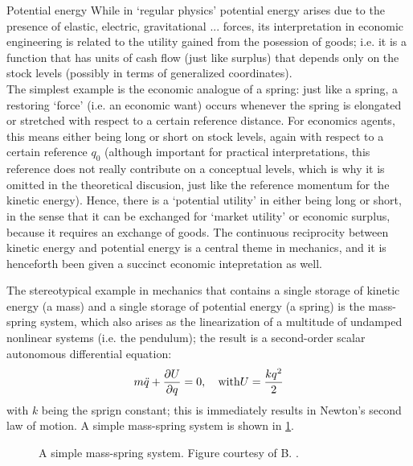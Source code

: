 \begin{econ}{Potential energy}
    While in `regular physics' potential energy arises due to the presence of elastic, electric, gravitational ... forces, its interpretation in economic engineering is related to the utility gained from the posession of goods; i.e. it is a function that has units of cash flow (just like surplus) that depends only on the stock levels (possibly in terms of generalized coordinates).\\

    The simplest example is the economic analogue of a spring: just like a spring, a restoring `force' (i.e. an economic want) occurs whenever the spring is elongated or stretched with respect to a certain reference distance. For economics agents, this means either being long or short on stock levels, again with respect to a certain reference $q_0$ (although important for practical interpretations, this reference does not really contribute on a conceptual levels, which is why it is omitted in the theoretical discusion, just like the reference momentum for the kinetic energy). Hence, there is a `potential utility' in either being long or short, in the sense that it can be exchanged for `market utility' or economic surplus, because it requires an exchange of goods. The continuous reciprocity between kinetic energy and 
    potential energy is a central theme in mechanics, and it is henceforth been given a succinct economic intepretation as well.
\end{econ}
The stereotypical example in mechanics that contains a single storage of kinetic energy (a mass) and a single storage of potential energy (a spring) is the mass-spring system, which also arises as the linearization of a multitude of undamped nonlinear systems (i.e. the pendulum); the result is a second-order scalar autonomous differential equation:
\begin{equation}
    m\ddot{q} + \pdv{U}{q} = 0, \quad \text{with} U = \frac{kq^2}{2}
    \label{eq:mass_spring}
\end{equation}
with $k$ being the sprign constant; this is immediately results in Newton's second law of motion. A simple mass-spring system is shown in \cref{fig:mass_spring}.
\begin{figure}[ht]
    \centering
    
    \caption{A simple mass-spring system. Figure courtesy of B. \citet{Krabbenborg2021}.}
    \label{fig:mass_spring}
\end{figure}

